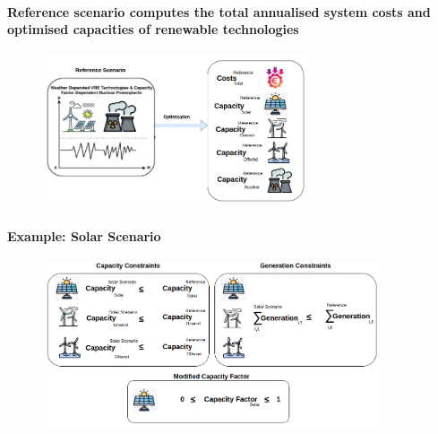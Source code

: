\documentclass[aspectratio=169]{beamer}
\begin{document}
\begin{frame}{\insertsectionhead}
\framesubtitle{ Reference scenario computes the total annualised system costs and optimised capacities of renewable technologies}
\begin{figure}
    \centering
    \includegraphics[width=0.7\textwidth]{method1.png}
  
  \end{figure}
\end{frame}

\begin{frame}{\insertsectionhead}
\framesubtitle{Example: Solar Scenario}
\begin{figure}
    \centering
    \includegraphics[width=0.9\textwidth]{cons.png}
  
  \end{figure}
\end{frame}
\end{document}
